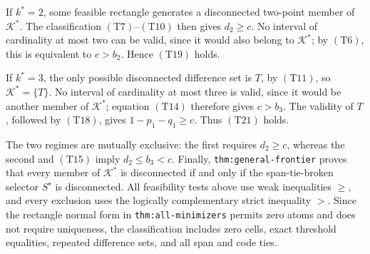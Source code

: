 If \(k^*=2\), some feasible rectangle generates a disconnected two-point member of \(\mathcal K^*\).  The classification \((\mathrm{T7})\)--\((\mathrm{T10})\) then gives \(d_2\geq c\).  No interval of cardinality at most two can be valid, since it would also belong to \(\mathcal K^*\); by \((\mathrm{T6})\), this is equivalent to \(c>b_2\).  Hence \((\mathrm{T19})\) holds.

If \(k^*=3\), the only possible disconnected difference set is \(T\), by \((\mathrm{T11})\), so \(\mathcal K^*=\{T\}\).  No interval of cardinality at most three is valid, since it would be another member of \(\mathcal K^*\); equation \((\mathrm{T14})\) therefore gives \(c>b_3\).  The validity of \(T\), followed by \((\mathrm{T18})\), gives \(1-p_1-q_1\geq c\).  Thus \((\mathrm{T21})\) holds.

The two regimes are mutually exclusive: the first requires \(d_2\geq c\), whereas the second and \((\mathrm{T15})\) imply \(d_2\leq b_3<c\).  Finally, \texttt{thm:general-frontier} proves that every member of \(\mathcal K^*\) is disconnected if and only if the span-tie-broken selector \(S^\star\) is disconnected.  All feasibility tests above use weak inequalities \(\geq\), and every exclusion uses the logically complementary strict inequality \(>\).  Since the rectangle normal form in \texttt{thm:all-minimizers} permits zero atoms and does not require uniqueness, the classification includes zero cells, exact threshold equalities, repeated difference sets, and all span and code ties.
